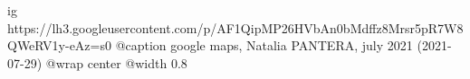  
 
 
 
 

\ifcmt
  ig https://lh3.googleusercontent.com/p/AF1QipMP26HVbAn0bMdffz8Mrsr5pR7W8QWeRV1y-eAz=s0
	@caption google maps, Natalia PANTERA, july 2021 (2021-07-29)
  @wrap center
  @width 0.8
\fi

